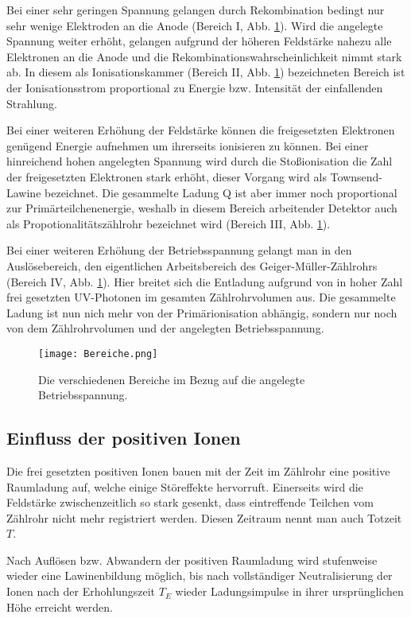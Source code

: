 Bei einer sehr geringen Spannung gelangen durch Rekombination bedingt nur sehr
wenige Elektroden an die Anode (Bereich I, Abb. \ref{fig:Bereiche}). Wird die
angelegte Spannung weiter erhöht, gelangen aufgrund der höheren Feldstärke nahezu
alle Elektronen an die Anode und die Rekombinationswahrscheinlichkeit nimmt
stark ab. In diesem als Ionisationskammer (Bereich II, Abb. \ref{fig:Bereiche})
bezeichneten Bereich ist der Ionisationsstrom proportional zu Energie bzw.
Intensität der einfallenden Strahlung.

Bei einer weiteren Erhöhung der Feldstärke können die freigesetzten Elektronen
genügend Energie aufnehmen um ihrerseits ionisieren zu können. Bei einer hinreichend
hohen angelegten Spannung wird durch die Stoßionisation die Zahl der freigesetzten
Elektronen stark erhöht, dieser Vorgang wird als Townsend-Lawine bezeichnet.
Die gesammelte Ladung Q ist aber immer noch proportional zur Primärteilchenenergie,
weshalb in diesem Bereich arbeitender Detektor auch als Propotionalitätszählrohr
bezeichnet wird (Bereich III, Abb. \ref{fig:Bereiche}).

Bei einer weiteren Erhöhung der Betriebsspannung gelangt man in den Auslösebereich,
den eigentlichen Arbeitsbereich des Geiger-Müller-Zählrohrs (Bereich IV, Abb.
\ref{fig:Bereiche}). Hier breitet sich die Entladung aufgrund von in hoher Zahl
frei gesetzten UV-Photonen im gesamten Zählrohrvolumen aus. Die gesammelte Ladung
ist nun nich mehr von der Primärionisation abhängig, sondern nur noch von
dem Zählrohrvolumen und der angelegten Betriebsspannung.

\begin{figure}
  \centering
  \texttt{[image: Bereiche.png]}
  \caption{Die verschiedenen Bereiche im Bezug auf die angelegte Betriebsspannung.}
  \label{fig:Bereiche}
\end{figure}

\subsection{Einfluss der positiven Ionen}

Die frei gesetzten positiven Ionen bauen mit der Zeit im Zählrohr eine positive
Raumladung auf, welche einige Störeffekte hervorruft. Einerseits wird die
Feldstärke zwischenzeitlich so stark gesenkt, dass eintreffende Teilchen vom
Zählrohr nicht mehr registriert werden. Diesen Zeitraum nennt man auch Totzeit $T$.

Nach Auflösen bzw. Abwandern der positiven Raumladung wird stufenweise wieder eine
Lawinenbildung möglich, bis nach vollständiger Neutralisierung der Ionen nach der
Erhohlungszeit $T_E$ wieder Ladungsimpulse in ihrer ursprünglichen Höhe erreicht
werden.

